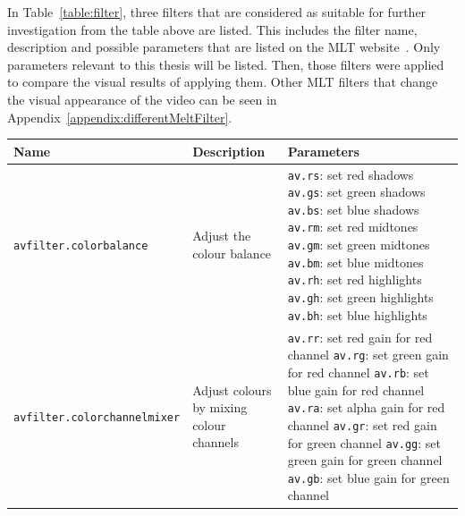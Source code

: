 \documentclass[../MasterThesis.tex]{subfiles}
\begin{document}
In Table~\ref{table:filter}, three filters that are considered as suitable for further investigation from the table above are listed. This includes the filter name, description and possible parameters that are listed on the MLT website~\cite{melt_filters}. Only parameters relevant to this thesis will be listed.
Then, those filters were applied to compare the visual results of applying them. 
Other MLT filters that change the visual appearance of the video can be seen in Appendix~\ref{appendix:differentMeltFilter}.



\begin{table}[H]
	\footnotesize
	\begin{tabular}{lp{4.4cm}p{4.5cm}}
		\toprule
		Name & Description & Parameters \\
		\midrule
		\texttt{avfilter.colorbalance} & Adjust the colour balance & 
		\tiny{
		\texttt{av.rs}: set red shadows \newline 
		\texttt{av.gs}: set green shadows \newline 
		\texttt{av.bs}: set blue shadows \newline 
		\texttt{av.rm}: set red midtones \newline 
		\texttt{av.gm}: set green midtones \newline 
		\texttt{av.bm}: set blue midtones \newline 
		\texttt{av.rh}: set red highlights \newline 
		\texttt{av.gh}: set green highlights \newline 
		\texttt{av.bh}: set blue highlights}
		\\
		\texttt{avfilter.colorchannelmixer} & Adjust colours by mixing colour channels & 
		\tiny{
		\texttt{av.rr}: set red gain for red channel \newline 
		\texttt{av.rg}: set green gain for red channel \newline 
		\texttt{av.rb}: set blue gain for red channel \newline 
		\texttt{av.ra}: set alpha gain for red channel \newline 
		\texttt{av.gr}: set red gain for green channel \newline 
		\texttt{av.gg}: set green gain for green channel \newline 
		\texttt{av.gb}: set blue gain for green channel \newline 
}
\end{tabular}
\end{table}
\end{document}
